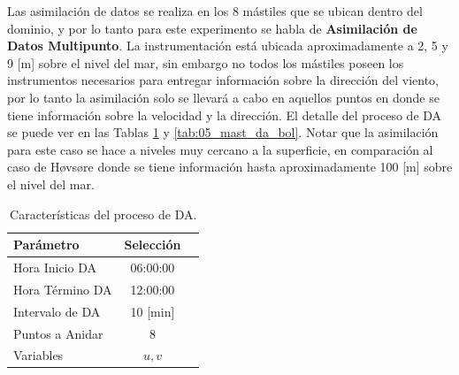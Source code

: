 Las asimilación de datos se realiza en los 8 mástiles que se ubican dentro del dominio, y por lo tanto para este experimento se habla de \textbf{Asimilación de Datos Multipunto}. La instrumentación está ubicada aproximadamente a 2, 5 y 9 [m] sobre el nivel del mar, sin embargo no todos los mástiles poseen los instrumentos necesarios para entregar información sobre la dirección del viento, por lo tanto la asimilación solo se llevará a cabo en aquellos puntos en donde se tiene información sobre la velocidad y la dirección. El detalle del proceso de DA se puede ver en las Tablas \ref{tab:05_config_da_bol} y \ref{tab:05_mast_da_bol}. Notar que la asimilación para este caso se hace a niveles muy cercano a la superficie, en comparación al caso de Høvsøre donde se tiene información hasta aproximadamente 100 [m] sobre el nivel del mar.

\begin{table}[h!]
	\caption{Características del proceso de DA.}\label{tab:05_config_da_bol}
	\centering\footnotesize
	\begin{tabular}{lcc}
		\toprule
		Parámetro & Selección \\
		\midrule
		Hora Inicio	DA 	 & 06:00:00   \\
		Hora Término DA	 		 & 12:00:00  \\
		Intervalo de DA	&	10 [min] \\
		Puntos a Anidar	 	 & 8   \\
		Variables	& $u,v$   \\
		\bottomrule
	\end{tabular}
\end{table}

\begin{table}[H]
	\caption{Detalle de la asimilación en cada mástil en Bolund.}\label{tab:05_mast_da_bol}
	\centering\footnotesize{}
\end{table}

